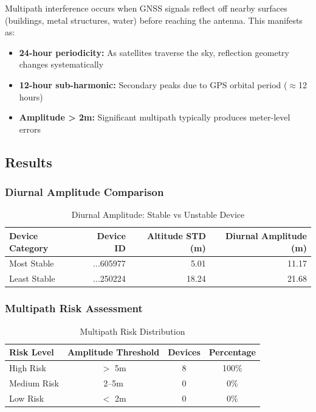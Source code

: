 \documentclass[11pt,a4paper]{article}
\begin{document}
Multipath interference occurs when GNSS signals reflect off nearby surfaces (buildings, metal structures, water) before reaching the antenna. This manifests as:

\begin{itemize}
    \item \textbf{24-hour periodicity:} As satellites traverse the sky, reflection geometry changes systematically
    \item \textbf{12-hour sub-harmonic:} Secondary peaks due to GPS orbital period ($\approx$12 hours)
    \item \textbf{Amplitude > 2m:} Significant multipath typically produces meter-level errors
\end{itemize}

\subsection{Results}

\subsubsection{Diurnal Amplitude Comparison}

\begin{table}[H]
\centering
\caption{Diurnal Amplitude: Stable vs Unstable Device}
\begin{tabular}{lrrr}
\toprule
\textbf{Device Category} & \textbf{Device ID} & \textbf{Altitude STD (m)} & \textbf{Diurnal Amplitude (m)} \\
\midrule
Most Stable & ...605977 & 5.01 & \textcolor{tier2}{11.17} \\
Least Stable & ...250224 & 18.24 & \textcolor{tier3}{21.68} \\
\bottomrule
\end{tabular}
\end{table}

\subsubsection{Multipath Risk Assessment}

\begin{table}[H]
\centering
\caption{Multipath Risk Distribution}
\begin{tabular}{lccc}
\toprule
\textbf{Risk Level} & \textbf{Amplitude Threshold} & \textbf{Devices} & \textbf{Percentage} \\
\midrule
\textcolor{tier3}{High Risk} & $>$ 5m & 8 & 100\% \\
\textcolor{tier2}{Medium Risk} & 2--5m & 0 & 0\% \\
\textcolor{tier1}{Low Risk} & $<$ 2m & 0 & 0\% \\
\bottomrule
\end{tabular}
\end{table}
\end{document}
